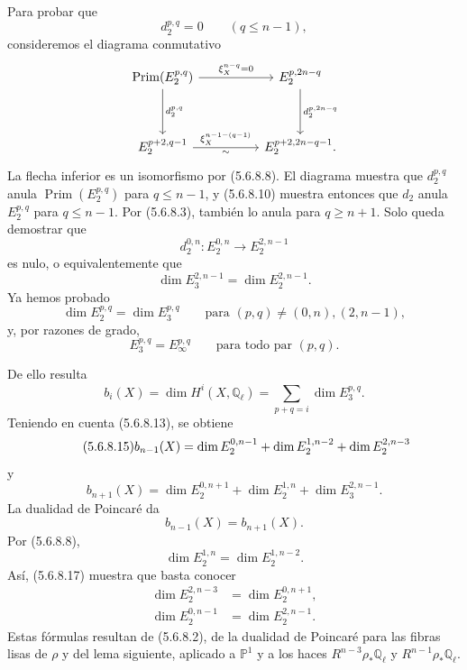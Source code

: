\pageoriginale

Para probar que
\[
d_2^{p,q}=0\qquad(q\leq n-1),
\]
consideremos el diagrama conmutativo
\[
\begin{tikzcd}[column sep=huge,row sep=huge]
\operatorname{Prim}(E_2^{p,q})
  \arrow[r,"\xi_X^{n-q}=0"]
  \arrow[d,"d_2^{p,q}"]
&
E_2^{p,2n-q}
  \arrow[d,"d_2^{p,2n-q}"]
\\
E_2^{p+2,q-1}
  \arrow[r,"\xi_X^{n-1-(q-1)}","\sim"']
&
E_2^{p+2,2n-q-1}.
\end{tikzcd}
\]
La flecha inferior es un isomorfismo por (5.6.8.8). El diagrama
muestra que $d_2^{p,q}$ anula $\operatorname{Prim}(E_2^{p,q})$ para
$q\leq n-1$, y (5.6.8.10) muestra entonces que $d_2$ anula
$E_2^{p,q}$ para $q\leq n-1$. Por (5.6.8.3), también lo anula para
$q\geq n+1$. Solo queda demostrar que
\[
d_2^{0,n}:E_2^{0,n}\longrightarrow E_2^{2,n-1}
\]
es nulo, o equivalentemente que
\begin{equation}\tag{5.6.8.12}
\dim E_3^{2,n-1}=\dim E_2^{2,n-1}.
\end{equation}
Ya hemos probado
\begin{equation}\tag{5.6.8.13}
\dim E_2^{p,q}=\dim E_3^{p,q}
\qquad\text{para }(p,q)\ne(0,n),(2,n-1),
\end{equation}
y, por razones de grado,
\begin{equation}\tag{5.6.8.14}
E_3^{p,q}=E_\infty^{p,q}
\qquad\text{para todo par }(p,q).
\end{equation}

\pageoriginale

De ello resulta
\[
b_i(X)=\dim H^i(X,\mathbb Q_\ell)
=\sum_{p+q=i}\dim E_3^{p,q}.
\]
Teniendo en cuenta (5.6.8.13), se obtiene
\begin{equation}\tag{5.6.8.15}
b_{n-1}(X)
=\dim E_2^{\sisi{c}{0},n-1}
 +\dim E_2^{1,n-2}
 +\sisi{\dim_2^{2,n-3}}{\dim E_2^{2,n-3}}
\end{equation}
y
\begin{equation}\tag{5.6.8.16}
b_{n+1}(X)
=\dim E_2^{0,n+1}
 +\dim E_2^{1,n}
 +\dim E_3^{2,n-1}.
\end{equation}
La dualidad de Poincaré da
\begin{equation}\tag{5.6.8.17}
b_{n-1}(X)=b_{n+1}(X).
\end{equation}
Por (5.6.8.8),
\[
\dim E_2^{1,n}=\dim E_2^{1,n-2}.
\]
Así, (5.6.8.17) muestra que basta conocer
\begin{align}
\dim E_2^{2,n-3}&=\dim E_2^{0,n+1},
\tag{5.6.8.18}\\
\dim E_2^{0,n-1}&=\dim E_2^{2,n-1}.
\tag{5.6.8.19}
\end{align}
Estas fórmulas resultan de (5.6.8.2), de la dualidad de Poincaré para
las fibras lisas de $\rho$ y del lema siguiente, aplicado a
$\mathbb P^1$ y a los haces $R^{n-3}\rho_*\mathbb Q_\ell$ y
$R^{n-1}\rho_*\mathbb Q_\ell$.

